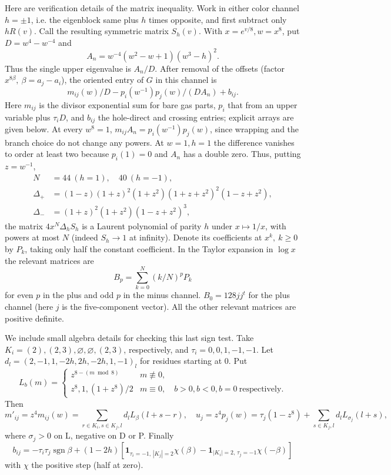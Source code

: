 Here are verification details of the matrix inequality. Work in either color channel \(h=\pm1\), i.e. the eigenblock same plus \(h\) times opposite, and first subtract only \(hR(v)\). Call the resulting symmetric matrix \(S_h(v)\). With \(x=e^{v/8}, w=x^8\), put \(D=w^4-w^{-4}\) and
\[
 A_n=w^{-4}(w^2-w+1)(w^3-h)^2.
\]
Thus the single upper eigenvalue is \(A_n/D\). After removal of the offsets (factor \(x^{8\beta},\ \beta=a_j-a_i\)), the oriented entry of \(G\) in this channel is
\[
 m_{ij}(w)/D - p_i(w^{-1})p_j(w)/(D A_n)+b_{ij}.
\]
Here \(m_{ij}\) is the divisor exponential sum for bare gas parts, \(p_i\) that from an upper variable plus \(\tau_i D\), and \(b_{ij}\) the hole-direct and crossing entries; explicit arrays are given below. At every \(w^8=1\), \(m_{ij}A_n=p_i(w^{-1})p_j(w)\), since wrapping and the branch choice do not change any powers. At \(w=1, h=1\) the difference vanishes to order at least two because \(p_i(1)=0\) and \(A_n\) has a double zero. Thus, putting \(z=w^{-1}\),
\[
 \begin{split}
 N&=44\ (h=1),\quad40\ (h=-1),\\
 \Delta_+&=(1-z)(1+z)^2(1+z^2)(1+z+z^2)^2(1-z+z^2),\\
 \Delta_-&=(1+z)^2(1+z^2)(1-z+z^2)^3 ,
 \end{split}
\]
the matrix \(4 x^N\Delta_h S_h\) is a Laurent polynomial of parity \(h\) under \(x\mapsto1/x\), with powers at most \(N\) (indeed \(S_h\to1\) at infinity). Denote its coefficients at \(x^k,\ k\ge0\) by \(P_k\), taking only half the constant coefficient. In the Taylor expansion in \(\log x\) the relevant matrices are
\[
 B_p=\sum_{k=0}^N (k/N)^p P_k
\]
for even \(p\) in the plus and odd \(p\) in the minus channel. \(B_0=128 j j^t\) for the plus channel (here \(j\) is the five-component vector). All the other relevant matrices are positive definite.

We include small algebra details for checking this last sign test. Take \(K_i=(2),(2,3),\varnothing,\varnothing,(2,3)\), respectively, and \(\tau_i=0,0,1,-1,-1\). Let \(d_l=(2,-1,1,-2h,2h,-2h,1,-1)_l\) for residues starting at 0. Put
\[
 L_b(m)=
 \begin{cases}
 z^{8-(m\bmod8)}&m\not\equiv0,\\
 z^8, 1, (1+z^8)/2&m\equiv0,\quad b>0, b<0, b=0\ \text{respectively}.
 \end{cases}
\]
Then
\[
 m'_{ij}=z^4 m_{ij}(w)=\sum_{r\in K_i,s\in K_j,l}d_l L_\beta(l+s-r),\quad
 u_j=z^4 p_j(w)=\tau_j(1-z^8)+\sum_{s\in K_j,l}d_l L_{\sigma_j}(l+s),
\]
where \(\sigma_j>0\) on L, negative on D or P. Finally
\[
 b_{ij}=-\tau_i\tau_j\operatorname{sgn}\beta+(1-2h)
 [\mathbf1_{\tau_i=-1,\,|K_j|=2}\chi(\beta)-
  \mathbf1_{|K_i|=2,\,\tau_j=-1}\chi(-\beta)]
\]
with \(\chi\) the positive step (half at zero).

